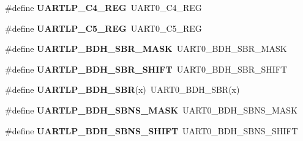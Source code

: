\begin{DoxyCompactItemize}
\item 
\mbox{\label{group___backward___compatibility___symbols_gaf72e56d7ea7d8a9c232d8ec3660b7451}} 
\#define {\bfseries U\+A\+R\+T\+L\+P\+\_\+\+C4\+\_\+\+R\+EG}~U\+A\+R\+T0\+\_\+\+C4\+\_\+\+R\+EG
\item 
\mbox{\label{group___backward___compatibility___symbols_gabc0ed230faba55a9874ca37a592326b3}} 
\#define {\bfseries U\+A\+R\+T\+L\+P\+\_\+\+C5\+\_\+\+R\+EG}~U\+A\+R\+T0\+\_\+\+C5\+\_\+\+R\+EG
\item 
\mbox{\label{group___backward___compatibility___symbols_ga0654a0aae3440ab5346eb9ecc4bd86d6}} 
\#define {\bfseries U\+A\+R\+T\+L\+P\+\_\+\+B\+D\+H\+\_\+\+S\+B\+R\+\_\+\+M\+A\+SK}~U\+A\+R\+T0\+\_\+\+B\+D\+H\+\_\+\+S\+B\+R\+\_\+\+M\+A\+SK
\item 
\mbox{\label{group___backward___compatibility___symbols_ga564ff56e5370588f01e2bc1a4e14d191}} 
\#define {\bfseries U\+A\+R\+T\+L\+P\+\_\+\+B\+D\+H\+\_\+\+S\+B\+R\+\_\+\+S\+H\+I\+FT}~U\+A\+R\+T0\+\_\+\+B\+D\+H\+\_\+\+S\+B\+R\+\_\+\+S\+H\+I\+FT
\item 
\mbox{\label{group___backward___compatibility___symbols_ga75784a3b6f6d3df174b6356880ae8e8f}} 
\#define {\bfseries U\+A\+R\+T\+L\+P\+\_\+\+B\+D\+H\+\_\+\+S\+BR}(x)~U\+A\+R\+T0\+\_\+\+B\+D\+H\+\_\+\+S\+BR(x)
\item 
\mbox{\label{group___backward___compatibility___symbols_ga6fee92bf869c5fe7376bd4aca728d4bc}} 
\#define {\bfseries U\+A\+R\+T\+L\+P\+\_\+\+B\+D\+H\+\_\+\+S\+B\+N\+S\+\_\+\+M\+A\+SK}~U\+A\+R\+T0\+\_\+\+B\+D\+H\+\_\+\+S\+B\+N\+S\+\_\+\+M\+A\+SK
\item 
\mbox{\label{group___backward___compatibility___symbols_gaaff5e47bbe5fd72ca58ec73c448a1962}} 
\#define {\bfseries U\+A\+R\+T\+L\+P\+\_\+\+B\+D\+H\+\_\+\+S\+B\+N\+S\+\_\+\+S\+H\+I\+FT}~U\+A\+R\+T0\+\_\+\+B\+D\+H\+\_\+\+S\+B\+N\+S\+\_\+\+S\+H\+I\+FT
\item 
\mbox{\label{group___backward___compatibility___symbols_gad02c1fb9539a43c1fea5e16d23505cbd}} 

\end{DoxyCompactItemize}
